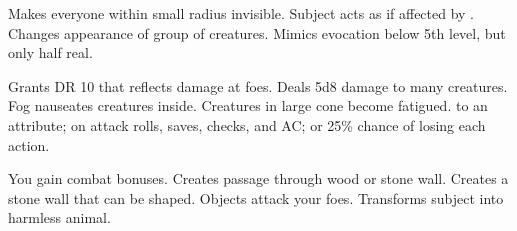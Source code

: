 \begin{swspelllist}
   Makes everyone within small radius invisible.
   Subject acts as if affected by .
   Changes appearance of group of creatures.
   Mimics evocation below 5th level, but only half real.

   Grants DR 10 that reflects damage at foes.
   Deals 5d8 damage to many creatures.
   Fog nauseates creatures inside.
   Creatures in large cone become fatigued.
    to an attribute;  on attack rolls, saves, checks, and AC; or 25\% chance of losing each action.
  \spellheadrestricted{}

  \M You gain combat bonuses.
   Creates passage through wood or stone wall.
   Creates a stone wall that can be shaped.
   Objects attack your foes.
   Transforms subject into harmless animal.
\end{swspelllist}

